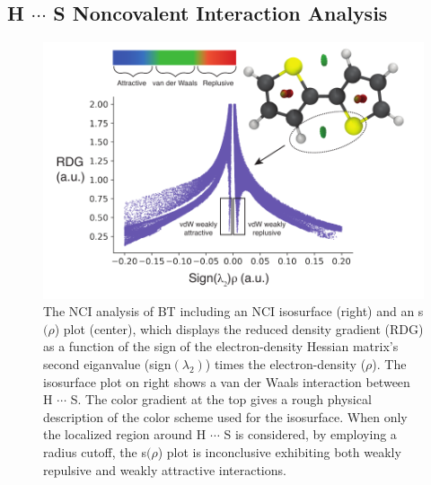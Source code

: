\subsection{\texorpdfstring{H $\cdots$ S}{HSN} Noncovalent Interaction Analysis}
\begin{figure}[hbt!]
    \centering
    \includegraphics{figures/append_aroma/pt_nci_copy.pdf}
    \caption{The NCI analysis of BT including an NCI isosurface (right) and an s$(\rho$) plot (center), which displays the reduced density gradient (RDG) as a function of the sign of the electron-density Hessian matrix's second eiganvalue (sign$(\lambda_{2})$) times the electron-density ($\rho$). The isosurface plot on right shows a van der Waals interaction between H $\cdots$ S. The color gradient at the top gives a rough physical description of the color scheme used for the isosurface. When only the localized region around H $\cdots$ S is considered, by employing a radius cutoff, the s$(\rho$) plot is inconclusive exhibiting both weakly repulsive and weakly attractive interactions.}
    \label{fig:pt_nci}
\end{figure}
\clearpage


